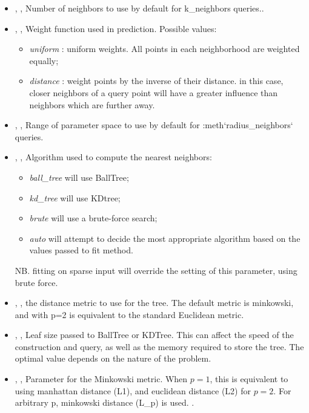 \begin{itemize}
  \item {}, ,
  Number of neighbors to use by default for k\_neighbors queries..
  \item {}, ,
  Weight function used in prediction.
  Possible values:
\begin{itemize}
    \item \textit{uniform} : uniform weights.
    All points in each neighborhood are weighted equally;
    \item \textit{distance} : weight points by the inverse of their distance.
    in this case, closer neighbors of a query point will have a greater
    influence than neighbors which are further away.
\end{itemize}

  \item {}, ,
  Range of parameter space to use by default for :meth`radius\_neighbors`
  queries.
  \item {}, ,
  Algorithm used to compute the nearest neighbors:
\begin{itemize}
    \item \textit{ball\_tree} will use BallTree;
    \item \textit{kd\_tree} will use KDtree;
    \item \textit{brute} will use a brute-force search;
    \item \textit{auto} will attempt to decide the most appropriate algorithm
    based on the values passed to fit method.
\end{itemize}
  NB.
  fitting on sparse input will override the setting of this parameter, using
  brute force.
  \item {}, ,
  the distance metric to use for the tree.
  The default metric is minkowski, and with p=2 is equivalent to the standard
  Euclidean metric.
  \item {}, ,
  Leaf size passed to BallTree or KDTree.
  This can affect the speed of the construction and query, as well as the memory
  required to store the tree.
  The optimal value depends on the nature of the problem.
  \item {}, ,
  Parameter for the Minkowski metric.
  When $p = 1$, this is equivalent to using manhattan distance (L1), and
  euclidean distance (L2) for $p = 2$.
  For arbitrary p, minkowski distance (L\_p) is used.
  .
\end{itemize}
